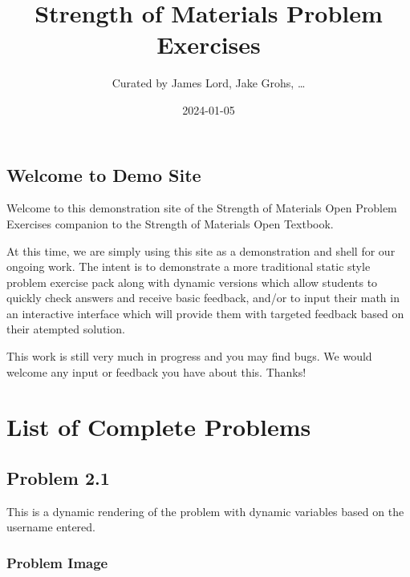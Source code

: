 \documentclass[
  letterpaper,
  DIV=11,
  numbers=noendperiod]{scrreprt}
\title{Strength of Materials Problem Exercises}
\author{Curated by James Lord, Jake Grohs, \ldots{}}
\date{2024-01-05}
\renewcommand*\contentsname{Table of contents}
\newcommand\contentsname{Table of contents}
\begin{document}
\maketitle

\renewcommand*\contentsname{Table of contents}
{
\hypersetup{linkcolor=}
\setcounter{tocdepth}{2}
\tableofcontents
}

\chapter*{Welcome to Demo Site}\label{welcome-to-demo-site}


Welcome to this demonstration site of the Strength of Materials Open
Problem Exercises companion to the Strength of Materials Open Textbook.

At this time, we are simply using this site as a demonstration and shell
for our ongoing work. The intent is to demonstrate a more traditional
static style problem exercise pack along with dynamic versions which
allow students to quickly check answers and receive basic feedback,
and/or to input their math in an interactive interface which will
provide them with targeted feedback based on their atempted solution.

This work is still very much in progress and you may find bugs. We would
welcome any input or feedback you have about this. Thanks!

\part{List of Complete Problems}

\chapter*{Problem 2.1}\label{problem-2.1}


This is a dynamic rendering of the problem with dynamic variables based
on the username entered.

\section*{Problem Image}\label{problem-image}
\end{document}

